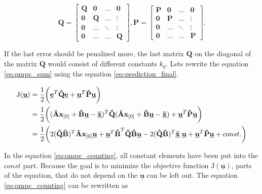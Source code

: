 \documentclass{article}
\newcommand{\uvec}{\textbf{\underline{u}}}
\begin{document}
\begin{equation}
\label{eq:qmpc_weighting_matrices}
\textbf{\^Q} = \begin{bmatrix}
\textbf{Q} & \textbf{0} & \hdots & \textbf{0} \\
\textbf{0} & \textbf{Q} & \hdots & \vdots \\
\textbf{0} & \hdots & \ddots & \vdots \\
\textbf{0} & \hdots & \hdots & \textbf{Q}
\end{bmatrix},
\textbf{\^P} = \begin{bmatrix}
\textbf{P} & \textbf{0} & \hdots & \textbf{0} \\
\textbf{0} & \textbf{P} & \hdots & \vdots \\
\textbf{0} & \hdots & \ddots & \vdots \\
\textbf{0} & \hdots & \hdots & \textbf{P}
\end{bmatrix}.
\end{equation}

If the last error should be penalized more, the last matrix $\textbf{Q}$ on the diagonal of the matrix $\textbf{\^Q}$ would consist of different constants $k_q$. Lets rewrite the equation \ref{eq:qmpc_sum} using the equation \ref{eq:prediction_final}.

\begin{equation}
\begin{split}
\label{eq:qmpc_counting}
\mathrm{J}(\underline{\textbf{u}}) 
&= \frac{1}{2}\bigg(\underline{\textbf{e}}^T 
\textbf{\^Q} \underline{\textbf{e}}+\underline{\textbf{u}}^T 
\textbf{\^P} \underline{\textbf{u}}\bigg)\\
&=\frac{1}{2}\bigg((\textbf{\^A}\textbf{x}_{[0]} + \textbf{\^B}	  \uvec-\underline{\textbf{\~x}})^T 
\textbf{\^Q}
(\textbf{\^A}\textbf{x}_{[0]} + \textbf{\^B}\uvec-\underline{\textbf{\~x}}) 
+\underline{\textbf{u}}^T 
\textbf{\^P} \underline{\textbf{u}}\bigg)\\
&=\frac{1}{2}\bigg(
2(\textbf{\^Q}\textbf{\^B})^T \textbf{\^A} \textbf{x}_{[0]} \underline{\textbf{u}}
+\uvec^T \textbf{\^B}^T\textbf{\^Q} \textbf{\^B}\uvec
-2(\textbf{\^Q}\textbf{\^B})^T \underline{\textbf{\~x}}\; \underline{\textbf{u}}
+\underline{\textbf{u}}^T 
\textbf{\^P} \underline{\textbf{u}}+const.\bigg)
\end{split}
\end{equation}

In the equation \ref{eq:qmpc_counting}, all constant elements have been put into the $const$ part. Because the goal is to minimize the objective function $\mathrm{J}(\underline{\textbf{u}})$, parts of the equation, that do not depend on the $\underline{\textbf{u}}$ can be left out. The equation \ref{eq:qmpc_counting} can be rewritten as
\end{document}
